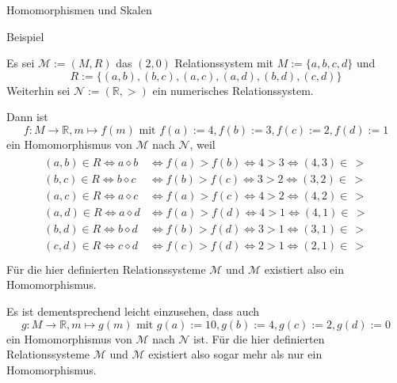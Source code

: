 \documentclass[
  8pt,
  ignorenonframetext,
]{beamer}
\begin{document}
\begin{frame}{Homomorphismen und Skalen}
\protect\hypertarget{homomorphismen-und-skalen-2}{}
\small

Beispiel

\footnotesize

Es sei \(\mathcal{M} := (M,R)\) das \((2,0)\) Relationssystem mit
\(M := \{a,b,c,d\}\) und \begin{equation}
R := \{(a,b), (b,c), (a,c), (a,d), (b,d), (c,d)\}
\end{equation} Weiterhin sei \(\mathcal{N} := (\mathbb{R},>)\) ein
numerisches Relationssystem.

Dann ist \begin{equation}
f : M \to \mathbb{R}, m \mapsto f(m) \mbox{ mit }
f(a) := 4, f(b) := 3, f(c) := 2, f(d) := 1
\end{equation} ein Homomorphismus von \(\mathcal{M}\) nach
\(\mathcal{N}\), weil \begin{align}
\begin{split}
(a,b) \in R \Leftrightarrow a \diamond b  & \Leftrightarrow f(a) > f(b) \Leftrightarrow 4 > 3 \Leftrightarrow (4,3) \in\, > \\
(b,c) \in R \Leftrightarrow b \diamond c  & \Leftrightarrow f(b) > f(c) \Leftrightarrow 3 > 2 \Leftrightarrow (3,2) \in\, > \\
(a,c) \in R \Leftrightarrow a \diamond c  & \Leftrightarrow f(a) > f(c) \Leftrightarrow 4 > 2 \Leftrightarrow (4,2) \in\, > \\
(a,d) \in R \Leftrightarrow a \diamond d  & \Leftrightarrow f(a) > f(d) \Leftrightarrow 4 > 1 \Leftrightarrow (4,1) \in\, > \\
(b,d) \in R \Leftrightarrow b \diamond d  & \Leftrightarrow f(b) > f(d) \Leftrightarrow 3 > 1 \Leftrightarrow (3,1) \in\, > \\
(c,d) \in R \Leftrightarrow c \diamond d  & \Leftrightarrow f(c) > f(d) \Leftrightarrow 2 > 1 \Leftrightarrow (2,1) \in\, > \\
\end{split}
\end{align} Für die hier definierten Relationssysteme \(\mathcal{M}\)
und \(\mathcal{M}\) existiert also ein Homomorphismus.

Es ist dementsprechend leicht einzusehen, dass auch \begin{equation}
g : M \to \mathbb{R}, m \mapsto g(m) \mbox{ mit }
g(a) := 10, g(b) := 4, g(c) := 2, g(d) := 0
\end{equation} ein Homomorphismus von \(\mathcal{M}\) nach
\(\mathcal{N}\) ist. Für die hier definierten Relationssysteme
\(\mathcal{M}\) und \(\mathcal{M}\) existiert also sogar mehr als nur
ein Homomorphismus.
\end{frame}
\end{document}
